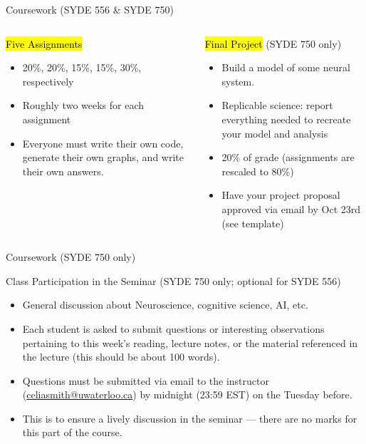 \documentclass[aspectratio=169]{beamer}
\begin{document}
\begin{frame}{Coursework (SYDE 556 \& SYDE 750)}
	\begin{columns}[t]
		\begin{block}{\hl{Five Assignments}}
		\begin{itemize}
				\item 20\%, 20\%, 15\%, 15\%, 30\%, respectively
				\item Roughly two weeks for each assignment
				\item Everyone must write their own code, generate their own graphs, and write their own answers.
			\end{itemize}
		\end{block}
		\begin{block}{\hl{Final Project} (SYDE 750 only)}
			\begin{itemize}
				\item Build a model of some neural system.
				\item Replicable science: report everything needed to recreate your model and analysis
				\item 20\% of grade (assignments are rescaled to 80\%)
				\item Have your project proposal approved via email by Oct 23rd (see template)
			\end{itemize}
		\end{block}
	\end{columns}
\end{frame}

\begin{frame}{Coursework (SYDE 750 only)}
	\begin{block}{Class Participation in the Seminar  (SYDE 750 only; optional for SYDE 556)}
	\begin{itemize}
		\item General discussion about Neuroscience, cognitive science, AI, etc.
		\item Each student is asked to submit questions or interesting observations pertaining to this week's reading, lecture notes, or the material referenced in the lecture (this should be about 100 words).
		\item Questions must be submitted via email to the instructor (\url{celiasmith@uwaterloo.ca}) by midnight (23:59 EST) on the Tuesday before.
    \item This is to ensure a lively discussion in the seminar --- there are no marks for this part of the course.
  \end{itemize}
	\end{block}
\end{frame}
\end{document}
